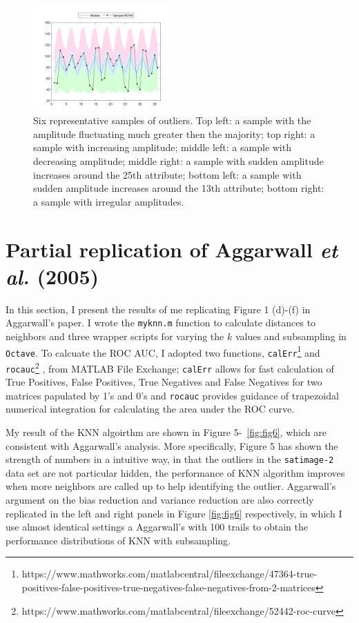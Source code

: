 \documentclass[12pt]{article}
\begin{document}
\begin{figure}
\includegraphics[width=0.48\textwidth]{outlier5799}
\caption{Six representative samples of outliers.
Top left: a sample with the amplitude fluctuating much greater then the majority;
top right: a sample with increasing amplitude;
middle left: a sample with decreasing amplitude;
middle right: a sample with sudden amplitude increases around the 25th attribute;
bottom left: a sample with sudden amplitude increases around the 13th attribute;
bottom right: a sample with irregular amplitudes.}
\label{fig:fig4}
\end{figure}

\vspace{1ex}
\section{Partial replication of Aggarwall \textit{et al.} (2005)}

In this section, I present the results of me replicating Figure 1 (d)-(f) in Aggarwall's paper.
I wrote the \texttt{my{\textunderscore}knn.m} function to calculate distances to neighbors and three wrapper scripts for varying 
the $k$ values and subsampling in \texttt{Octave}. To calcuate the ROC AUC, I adopted two 
functions, \texttt{calErr}\footnote{https://www.mathworks.com/matlabcentral/fileexchange/47364-true-positives-false-positives-true-negatives-false-negatives-from-2-matrices}
and
\texttt{roc{\textunderscore}auc}\footnote{https://www.mathworks.com/matlabcentral/fileexchange/52442-roc-curve}
, from MATLAB File Exchange;
\texttt{calErr} allows for fast calculation of True Positives, False Positives, True Negatives and False Negatives
for two matrices papulated  by 1's and 0's and \texttt{roc{\textunderscore}auc} provides guidance
of trapezoidal numerical integration for calculating the area under the ROC curve.

My result of the KNN algoirthm are shown in Figure 5-~\ref{fig:fig6}, which are consistent with Aggarwall's analysis. 
More specifically, Figure 5 has shown the strength of numbers in a intuitive way, in that the outliers in the
\texttt{satimage-2} data set are not particular hidden, the performance of KNN algorithm improves when more neighbors are called
up to help identifying the outlier.
Aggarwall's argument on the bias reduction and variance reduction are also correctly replicated in the left and right panels 
in Figure \ref{fig:fig6} respectively, in which I use almost identical settings a Aggarwall's with 100 trails to obtain the
performance distributions of KNN with subsampling.
\end{document}
